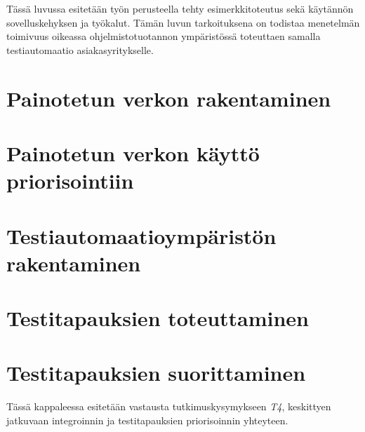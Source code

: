 Tässä luvussa esitetään työn perusteella tehty esimerkkitoteutus sekä käytännön sovelluskehyksen ja työkalut.
Tämän luvun tarkoituksena on todistaa menetelmän toimivuus oikeassa ohjelmistotuotannon ympäristössä toteuttaen samalla testiautomaatio asiakasyritykselle.

\section{Painotetun verkon rakentaminen} \label{ch:11_painotetun_verkon_rakentaminen}


\section{Painotetun verkon käyttö priorisointiin} \label{ch:11_painotetun_verkon_kaytto_priorisointiin}


\section{Testiautomaatioympäristön rakentaminen} \label{ch:11_testiautomaatioympariston_rakentaminen}


\section{Testitapauksien toteuttaminen} \label{ch:11_testitapauksien_toteuttaminen}


\section{Testitapauksien suorittaminen} \label{ch:11_testitapauksien_suorittaminen}

  Tässä kappaleessa esitetään vastausta tutkimuskysymykseen \emph{T4}, keskittyen jatkuvaan integroinnin ja testitapauksien priorisoinnin yhteyteen.

